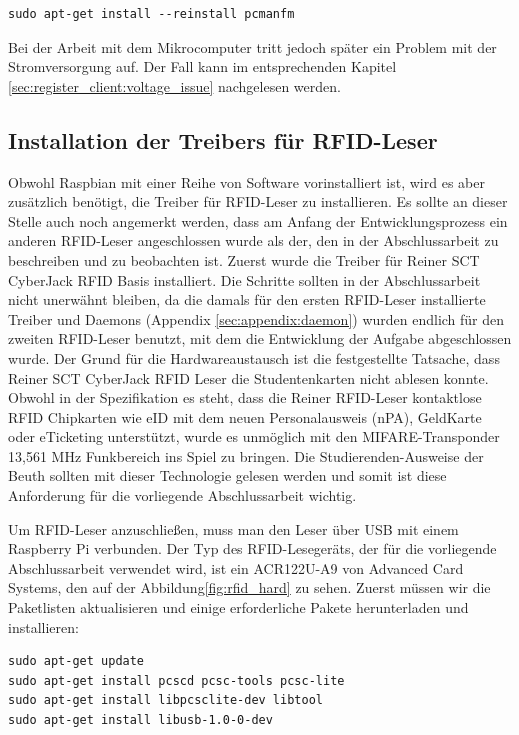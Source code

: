 \begin{lstlisting}
sudo apt-get install --reinstall pcmanfm
\end{lstlisting}
Bei der Arbeit mit dem Mikrocomputer tritt jedoch später ein Problem mit der Stromversorgung auf. Der Fall kann im entsprechenden Kapitel \ref{sec:register_client:voltage_issue} nachgelesen werden.


\subsection{Installation der Treibers für RFID-Leser}
\label{sec:register_client:install_rfid}
Obwohl Raspbian mit einer Reihe von Software vorinstalliert ist, wird es aber zusätzlich benötigt, die Treiber für RFID-Leser zu installieren. Es sollte an dieser Stelle auch noch angemerkt werden, dass am Anfang der Entwicklungsprozess ein anderen RFID-Leser angeschlossen wurde als der, den in der Abschlussarbeit zu beschreiben und zu beobachten ist. Zuerst wurde die Treiber für Reiner SCT CyberJack RFID Basis\cite{website:4} installiert. Die Schritte sollten in der Abschlussarbeit nicht unerwähnt bleiben, da die damals für den ersten RFID-Leser installierte Treiber und Daemons (Appendix \ref{sec:appendix:daemon}) wurden endlich für den zweiten RFID-Leser benutzt, mit dem die Entwicklung der Aufgabe abgeschlossen wurde. Der Grund für die Hardwareaustausch ist die festgestellte Tatsache, dass Reiner SCT CyberJack RFID Leser die Studentenkarten nicht ablesen konnte. Obwohl in der Spezifikation es steht, dass die Reiner RFID-Leser kontaktlose RFID Chipkarten wie eID mit dem neuen Personalausweis (nPA), GeldKarte oder eTicketing unterstützt, wurde es unmöglich mit den MIFARE-Transponder 13,561 MHz Funkbereich ins Spiel zu bringen. Die Studierenden-Ausweise der Beuth sollten mit dieser Technologie gelesen werden und somit ist diese Anforderung für die vorliegende Abschlussarbeit wichtig. 

Um RFID-Leser anzuschließen, muss man den Leser über USB mit einem Raspberry Pi verbunden. Der Typ des RFID-Lesegeräts, der für die vorliegende Abschlussarbeit verwendet wird, ist ein ACR122U-A9 von Advanced Card Systems\cite{website:7}, den auf der Abbildung\ref{fig:rfid_hard} zu sehen. Zuerst müssen wir die Paketlisten aktualisieren und einige erforderliche Pakete herunterladen und installieren:\cite{website:6}
\begin{lstlisting}
sudo apt-get update
sudo apt-get install pcscd pcsc-tools pcsc-lite
sudo apt-get install libpcsclite-dev libtool
sudo apt-get install libusb-1.0-0-dev
\end{lstlisting}

